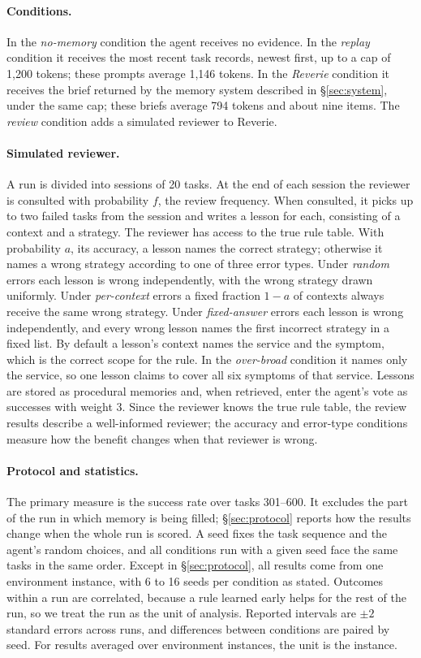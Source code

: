 \documentclass{article}
\begin{document}
\paragraph{Conditions.}
In the \emph{no-memory} condition the agent receives no evidence. In the \emph{replay}
condition it receives the most recent task records, newest first, up to a cap of 1,200
tokens; these prompts average 1,146 tokens. In the \emph{Reverie} condition it receives
the brief returned by the memory system described in \S\ref{sec:system}, under the same
cap; these briefs average 794 tokens and about nine items. The \emph{review} condition
adds a simulated reviewer to Reverie.

\paragraph{Simulated reviewer.}
A run is divided into sessions of 20 tasks. At the end of each session the reviewer is
consulted with probability $f$, the review frequency. When consulted, it picks up to
two failed tasks from the session and writes a lesson for each, consisting of a context
and a strategy. The reviewer has access to the true rule table. With probability $a$,
its accuracy, a lesson names the correct strategy; otherwise it names a wrong strategy
according to one of three error types. Under \emph{random} errors each lesson is wrong
independently, with the wrong strategy drawn uniformly. Under \emph{per-context} errors
a fixed fraction $1-a$ of contexts always receive the same wrong strategy. Under
\emph{fixed-answer} errors each lesson is wrong independently, and every wrong lesson
names the first incorrect strategy in a fixed list. By default a lesson's context names
the service and the symptom, which is the correct scope for the rule. In the
\emph{over-broad} condition it names only the service, so one lesson claims to cover all
six symptoms of that service. Lessons are stored as procedural memories and, when
retrieved, enter the agent's vote as successes with weight 3. Since the reviewer knows
the true rule table, the review results describe a well-informed reviewer; the accuracy
and error-type conditions measure how the benefit changes when that reviewer is wrong.

\paragraph{Protocol and statistics.}
The primary measure is the success rate over tasks 301--600. It excludes the part of
the run in which memory is being filled; \S\ref{sec:protocol} reports how the results
change when the whole run is scored. A seed fixes the task sequence and the agent's
random choices, and all conditions run with a given seed face the same tasks in the same
order. Except in \S\ref{sec:protocol}, all results come from one environment instance,
with 6 to 16 seeds per condition as stated. Outcomes within a run are correlated,
because a rule learned early helps for the rest of the run, so we treat the run as the
unit of analysis. Reported intervals are $\pm 2$ standard errors across runs, and
differences between conditions are paired by seed. For results averaged over
environment instances, the unit is the instance.
\end{document}
